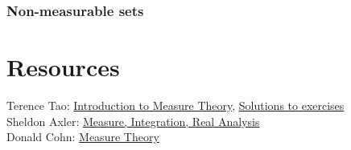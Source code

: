 \documentclass[answers,12pt]{exam}
\begin{document}
\subsubsection{Non-measurable sets}


\section{Resources}
Terence Tao: \href{https://terrytao.files.wordpress.com/2012/12/gsm-126-tao5-measure-book.pdf}{Introduction to Measure Theory}, \href{https://math.solverer.com/library/terence_tao/an_introduction_to_measure_theory}{Solutions to exercises}\\
Sheldon Axler: \href{https://measure.axler.net/MIRA.pdf}{Measure, Integration, Real Analysis}\\
Donald Cohn: \href{https://www.fayoum.edu.eg/stfsys/stfFiles/273/1342/Measure%20Theory%20(2nd%20ed.)%20-%20Cohn,%20Donald%20L._5990.pdf}{Measure Theory}
\end{document}

